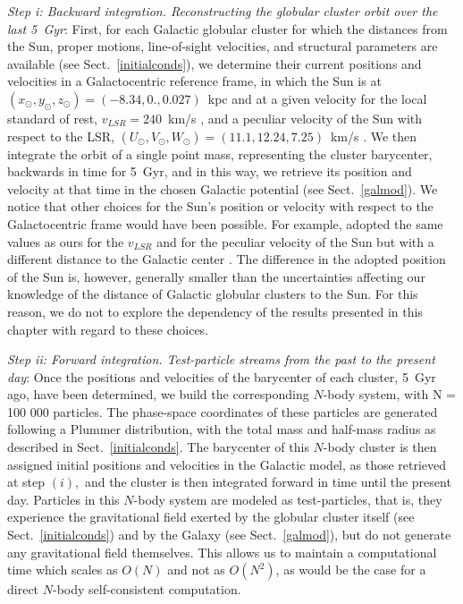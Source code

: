         \textit{Step i: Backward integration. Reconstructing the globular cluster orbit over the last 5~Gyr}: First, for each Galactic globular cluster for which the distances from the Sun, proper motions, line-of-sight velocities, and structural parameters are  available (see Sect.~\ref{initialconds}), we determine their current positions and velocities in a Galactocentric reference frame, in which the Sun is at $(x_\odot, y_\odot, z_\odot) = (-8.34, 0., 0.027)$~kpc \citep{2001ApJ...553..184C, 2014ApJ...783..130R} and at a given velocity for the local standard of rest, $v_{LSR}= 240$~km/s \citep{2014ApJ...783..130R}, and a peculiar velocity of the Sun with respect to the LSR, $(U_{\odot}, V_{\odot}, W_{\odot})  = (11.1, 12.24, 7.25)$~km/s \citep{2010MNRAS.403.1829S}. We then integrate the orbit of a single point mass, representing the cluster barycenter, backwards in time for 5~Gyr, and in this way, we retrieve its position and velocity at that time in the chosen Galactic potential (see Sect.~\ref{galmod}). We notice that other choices for the Sun's position or velocity with respect to the Galactocentric frame would have been possible. For example, \citet{2021MNRAS.505.3033P} adopted the same values as ours for the $v_{LSR}$ and for the peculiar velocity of the Sun but with a different distance to the Galactic center \citep[8.1~kpc in their work, see][]{2018A&A...615L..15G}. The difference in the adopted position of the Sun is, however, generally smaller than the uncertainties affecting our knowledge of the distance of Galactic globular clusters to the Sun. For this reason, we do not to explore the dependency of the results presented in this chapter with regard to these choices. 

        \textit{Step ii: Forward integration. Test-particle streams from the past to the present day}: Once the positions and velocities of the barycenter of each cluster, 5~Gyr ago, have been determined, we build  the corresponding $N$-body system, with N = 100 000 particles.  The phase-space coordinates of these particles are generated following a Plummer distribution, with the total mass and half-mass radius as described in Sect.~\ref{initialconds}. The barycenter of this $N$-body cluster is then assigned initial positions and velocities in the Galactic model, as those retrieved at step $(i),$ and the cluster is then integrated forward in time until the present day. Particles in this $N$-body system are modeled as test-particles, that is, they experience the gravitational field exerted by the globular cluster itself (see Sect.~\ref{initialconds}) and by the Galaxy (see Sect.~\ref{galmod}), but do not generate any gravitational field themselves. This allows us to maintain a computational time which scales as $O(N)$ and not as $O(N^2)$, as would be the case for a direct $N$-body self-consistent computation.

